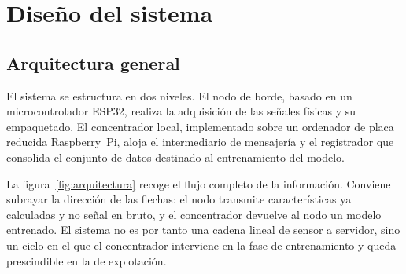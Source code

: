 \chapter{Diseño del sistema}
\label{cap:diseno}

\section{Arquitectura general}

El sistema se estructura en dos niveles. El nodo de borde, basado en un microcontrolador
ESP32, realiza la adquisición de las señales físicas y su empaquetado. El concentrador
local, implementado sobre un ordenador de placa reducida Raspberry~Pi, aloja el
intermediario de mensajería y el registrador que consolida el conjunto de datos destinado al
entrenamiento del modelo.

La figura~\ref{fig:arquitectura} recoge el flujo completo de la información. Conviene
subrayar la dirección de las flechas: el nodo transmite características ya calculadas y no
señal en bruto, y el concentrador devuelve al nodo un modelo entrenado. El sistema no es por
tanto una cadena lineal de sensor a servidor, sino un ciclo en el que el concentrador
interviene en la fase de entrenamiento y queda prescindible en la de explotación.

